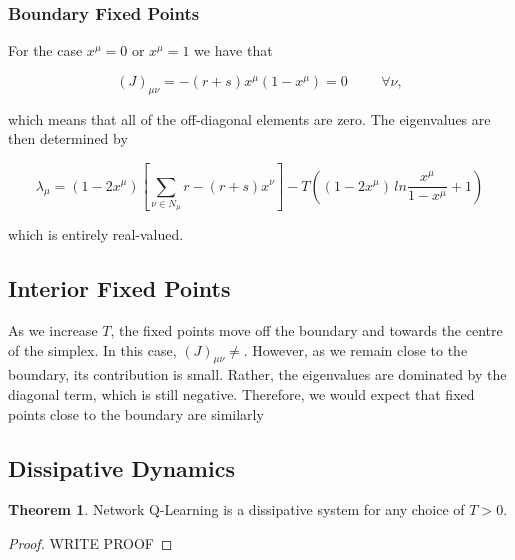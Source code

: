 \documentclass[preprint,12pt]{article}
\theoremstyle{definition}
\theoremstyle{theorem}
\newtheorem{theorem}{Theorem}
\theoremstyle{remark}
\theoremstyle{example}
\newcommand{\xmu}{x^\mu}
\newcommand{\xnu}{x^\nu}
\begin{document}
	\subsubsection*{Boundary Fixed Points}
	
	For the case $\xmu = 0$ or $\xmu = 1$ we have that
	
	\begin{equation}
		\left( J \right)_{\mu \nu} = -(r + s)\xmu(1 - \xmu) = 0 \hspace{1cm}  \forall \nu,
	\end{equation}

	which means that all of the off-diagonal elements are zero. The eigenvalues are then determined by
	
	\begin{equation}
		\lambda_\mu = (1 - 2 \xmu)\left[ \sum_{\nu \in N_\mu} r - (r + s) \xnu \right] -  T \left( (1 - 2\xmu) \, ln \frac{\xmu}{1 - \xmu} + 1 \right)
	\end{equation}

	which is entirely real-valued. 
	
	\subsection{Interior Fixed Points}

	As we increase $T$, the fixed points move off the boundary and towards the centre of the simplex. In this case, $(J)_{\mu \nu} \neq$. However, as we remain close to the boundary, its contribution is small. Rather, the eigenvalues are dominated by the diagonal term, which is still negative. Therefore, we would expect that fixed points close to the boundary are similarly 

	\subsection*{Dissipative Dynamics}
	
	\begin{theorem}
		Network Q-Learning is a dissipative system for any choice of $T > 0$. 
	\end{theorem}

	\begin{proof}
		WRITE PROOF
	\end{proof}
	
\end{document}
